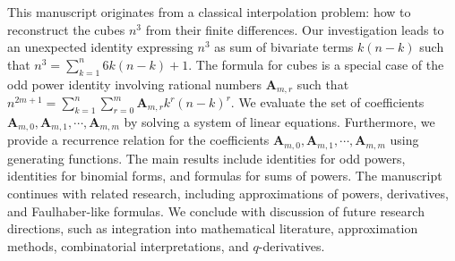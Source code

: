 This manuscript originates from a classical interpolation problem: how to reconstruct the cubes $n^3$
from their finite differences.
Our investigation leads to an unexpected identity expressing $n^3$ as sum of bivariate terms $k(n-k)$
such that $n^3=\sum_{k=1}^{n} 6k(n-k) + 1$.
The formula for cubes is a special case of the odd power identity involving rational numbers $\mathbf{A}_{m,r}$
such that $n^{2m+1} = \sum_{k=1}^{n} \sum_{r=0}^{m} \mathbf{A}_{m,r} k^r (n-k)^r$.
We evaluate the set of coefficients $\mathbf{A}_{m,0}, \mathbf{A}_{m,1}, \cdots, \mathbf{A}_{m,m}$
by solving a system of linear equations.
Furthermore, we provide a recurrence relation
for the coefficients $\mathbf{A}_{m,0}, \mathbf{A}_{m,1}, \cdots, \mathbf{A}_{m,m}$ using
generating functions.
The main results include identities for odd powers, identities for binomial forms,
and formulas for sums of powers.
The manuscript continues with related research, including approximations of powers, derivatives,
and Faulhaber-like formulas.
We conclude with discussion of future research directions, such as integration into mathematical literature,
approximation methods, combinatorial interpretations, and $q$-derivatives.

